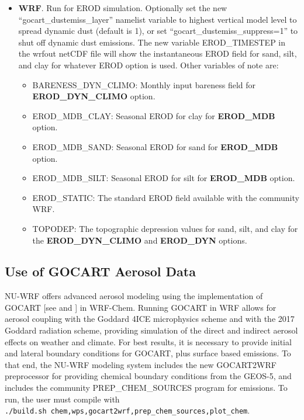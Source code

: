 \begin{itemize}
\item \textbf{WRF}. Run for EROD simulation. Optionally set the new
``gocart\_dustemiss\_layer'' namelist variable to highest vertical model level
to spread dynamic dust (default is 1), or set 
``gocart\_dustemiss\_suppress=1'' to shut off dynamic dust emissions. The new 
variable EROD\_TIMESTEP in the wrfout netCDF file will show the instantaneous 
EROD field for sand, silt, and clay for whatever EROD option is used. Other 
variables of note are:

\begin{itemize}
\item BARENESS\_DYN\_CLIMO: Monthly input bareness field for\\
  \textbf{EROD\_DYN\_CLIMO} option.
\item EROD\_MDB\_CLAY: Seasonal EROD for clay for \textbf{EROD\_MDB} option.
\item EROD\_MDB\_SAND: Seasonal EROD for sand for \textbf{EROD\_MDB} option.
\item EROD\_MDB\_SILT: Seasonal EROD for silt for \textbf{EROD\_MDB} option.
\item EROD\_STATIC: The standard EROD field available with the community WRF.
\item TOPODEP: The topographic depression values for sand, silt, and clay
for the \textbf{EROD\_DYN\_CLIMO} and \textbf{EROD\_DYN} options.
\end{itemize}

\end{itemize}

\subsection{Use of GOCART Aerosol Data}
\label{subsec:GocartWorkflow}

NU-WRF offers advanced aerosol modeling using the implementation of GOCART
 [see \cite{ref:ChinEtAl2002} and \cite{ref:GinouxEtAl2001}] in WRF-Chem. 
Running GOCART in WRF allows for aerosol coupling with the Goddard 
4ICE microphysics scheme and with the 2017 Goddard radiation 
scheme, providing simulation of the direct and indirect aerosol effects on 
weather and climate. For best results, it is necessary to provide initial and 
lateral boundary conditions for GOCART, plus surface based emissions. To that 
end, the NU-WRF modeling system includes the new GOCART2WRF preprocessor for 
providing chemical boundary conditions from the GEOS-5, and includes the 
community PREP\_CHEM\_SOURCES program for emissions. To run, the user must 
compile with\\
\texttt{./build.sh chem,wps,gocart2wrf,prep\_chem\_sources,plot\_chem}.

